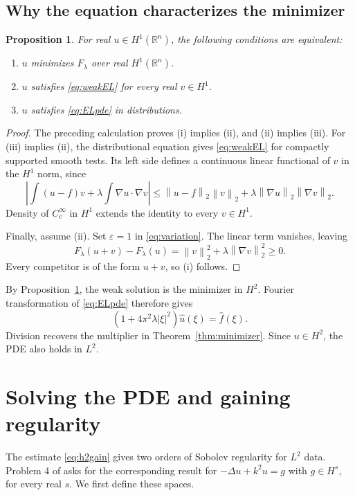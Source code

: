 \documentclass[11pt]{article}
\numberwithin{equation}{section}
\newtheorem{proposition}[theorem]{Proposition}
\theoremstyle{definition}
\theoremstyle{remark}
\newcommand{\R}{\mathbb R}
\newcommand{\norm}[1]{\left\|#1\right\|}
\newcommand{\wh}[1]{\widehat{#1}}
\begin{document}
\subsection{Why the equation characterizes the minimizer}
\begin{proposition}\label{prop:equivalence}
For real \(u\in H^1(\R^n)\), the following conditions are equivalent:
\begin{enumerate}[label=(\roman*),itemsep=2pt]
 \item \(u\) minimizes \(F_\lambda\) over real \(H^1(\R^n)\).
 \item \(u\) satisfies \eqref{eq:weakEL} for every real \(v\in H^1\).
 \item \(u\) satisfies \eqref{eq:ELpde} in distributions.
\end{enumerate}
\end{proposition}
\begin{proof}
The preceding calculation proves (i) implies (ii), and (ii) implies (iii). For (iii) implies (ii), the distributional equation gives \eqref{eq:weakEL} for compactly supported smooth tests. Its left side defines a continuous linear functional of \(v\) in the \(H^1\) norm, since
\[
 \left|\int(u-f)v+\lambda\int\nabla u\cdot\nabla v\right|
 \le\norm{u-f}_2\norm v_2
             +\lambda\norm{\nabla u}_2\norm{\nabla v}_2.
\]
Density of \(C_c^\infty\) in \(H^1\) extends the identity to every \(v\in H^1\).

Finally, assume (ii). Set \(\varepsilon=1\) in \eqref{eq:variation}. The linear term vanishes, leaving
\[
 F_\lambda(u+v)-F_\lambda(u)
            =\norm v_2^2+\lambda\norm{\nabla v}_2^2\ge0.
\]
Every competitor is of the form \(u+v\), so (i) follows.
\end{proof}

By Proposition~\ref{prop:equivalence}, the weak solution is the minimizer in \(H^2\). Fourier transformation of \eqref{eq:ELpde} therefore gives
\[
 (1+4\pi^2\lambda|\xi|^2)\wh u(\xi)=\wh f(\xi).
\]
Division recovers the multiplier in Theorem~\ref{thm:minimizer}. Since \(u\in H^2\), the PDE also holds in \(L^2\).

\section{Solving the PDE and gaining regularity}\label{sec:pde}
The estimate \eqref{eq:h2gain} gives two orders of Sobolev regularity for \(L^2\) data. Problem 4 of \cite{vese-pde} asks for the corresponding result for \(-\Delta u+k^2u=g\) with \(g\in H^s\), for every real \(s\). We first define these spaces.
\end{document}

